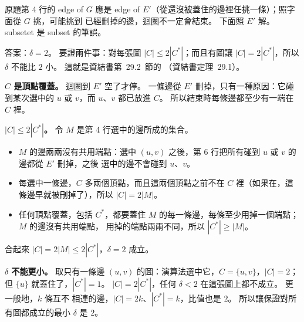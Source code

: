 \begin{pastsoln}
原題第 4 行的 edge of $G$ 應是 edge of $E'$（從還沒被蓋住的邊裡任挑一條）；照字面從 $G$ 挑，可能挑到
已經刪掉的邊，迴圈不一定會結束。 下面照 $E'$ 解。 subsetet 是 subset 的筆誤。

答案：$\delta = 2$。 要證兩件事：對每張圖 $|C| \le 2|C^*|$；而且有圖讓 $|C| = 2|C^*|$，所以 $\delta$ 不能比
$2$ 小。 這就是資結書第~29.2~節的 （資結書定理~29.1）。

\textbf{$C$ 是頂點覆蓋。} 迴圈到 $E'$ 空了才停。 一條邊從 $E'$ 刪掉，只有一種原因：它碰到某次選中的 $u$
或 $v$，而 $u$、$v$ 都已放進 $C$。 所以結束時每條邊都至少有一端在 $C$ 裡。

\textbf{$|C| \le 2|C^*|$。} 令 $M$ 是第 4 行選中的邊所成的集合。
\begin{itemize}
\item $M$ 的邊兩兩沒有共用端點：選中 $(u, v)$ 之後，第 6 行把所有碰到 $u$ 或 $v$ 的邊都從 $E'$ 刪掉，之後
選中的邊不會碰到 $u$、$v$。
\item 每選中一條邊，$C$ 多兩個頂點，而且這兩個頂點之前不在 $C$ 裡（如果在，這條邊早就被刪掉了），所以
$|C| = 2|M|$。
\item 任何頂點覆蓋，包括 $C^*$，都要蓋住 $M$ 的每一條邊，每條至少用掉一個端點；$M$ 的邊沒有共用端點，
用掉的端點兩兩不同，所以 $|C^*| \ge |M|$。
\end{itemize}
合起來 $|C| = 2|M| \le 2|C^*|$，$\delta = 2$ 成立。

\textbf{$\delta$ 不能更小。} 取只有一條邊 $(u, v)$ 的圖：演算法選中它，$C = \{u, v\}$，$|C| = 2$；但
$\{u\}$ 就蓋住了，$|C^*| = 1$。 $|C| = 2|C^*|$，任何 $\delta < 2$ 在這張圖上都不成立。 更一般地，$k$ 條互不
相連的邊，$|C| = 2k$、$|C^*| = k$，比值也是 $2$。 所以讓保證對所有圖都成立的最小 $\delta$ 是 $2$。
\end{pastsoln}
